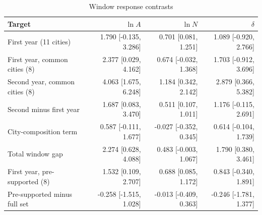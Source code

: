 \begin{table}[htbp]
\centering\small
\caption{Window response contrasts}\label{tab:responses}
\begin{tabular}{p{.27\linewidth}rrr}
\toprule
Target & $\ln A$ & $\ln N$ & $\delta$ \\
\midrule
First year (11 cities) & 1.790 [-0.135, 3.286] & 0.701 [0.081, 1.251] & 1.089 [-0.920, 2.766] \\
First year, common cities (8) & 2.377 [0.029, 4.162] & 0.674 [-0.032, 1.368] & 1.703 [-0.912, 3.696] \\
Second year, common cities (8) & 4.063 [1.675, 6.248] & 1.184 [0.342, 2.142] & 2.879 [0.366, 5.382] \\
Second minus first year & 1.687 [0.083, 3.470] & 0.511 [0.107, 1.011] & 1.176 [-0.115, 2.691] \\
City-composition term & 0.587 [-0.111, 1.677] & -0.027 [-0.352, 0.345] & 0.614 [-0.104, 1.739] \\
Total window gap & 2.274 [0.628, 4.088] & 0.483 [-0.003, 1.067] & 1.790 [0.380, 3.461] \\
First year, pre-supported (8) & 1.532 [0.109, 2.707] & 0.688 [0.085, 1.172] & 0.843 [-0.340, 1.891] \\
Pre-supported minus full set & -0.258 [-1.515, 1.028] & -0.013 [-0.409, 0.363] & -0.246 [-1.781, 1.377] \\
\bottomrule
\end{tabular}
\end{table}
